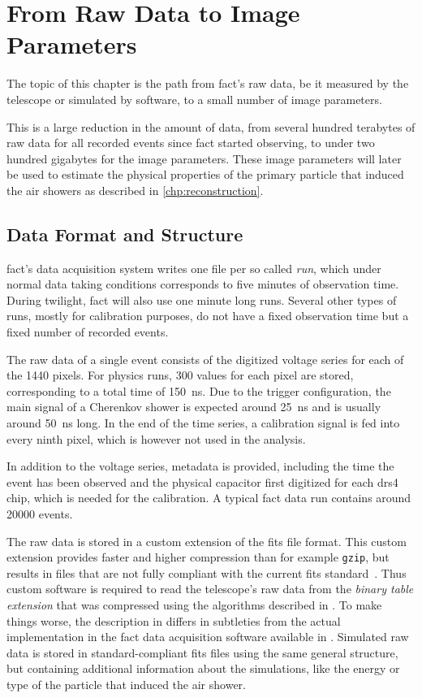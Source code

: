 \chapter{From Raw Data to Image Parameters}\label{chp:preprocessing}
The topic of this chapter is the path from \gls{fact}'s raw data, be it measured
by the telescope or simulated by software, to a small number of image parameters.

This is a large reduction in the amount of data, from several hundred terabytes
of raw data for all recorded events since \gls{fact} started observing, to
under two hundred gigabytes for the image parameters.
These image parameters will later be used to estimate the physical properties
of the primary particle that induced the air showers as described in \autoref{chp:reconstruction}.

\section{Data Format and Structure}

\gls{fact}'s data acquisition system writes one file per so called \emph{run},
which under normal data taking conditions corresponds to five minutes of observation time.
During twilight, \gls{fact} will also use one minute long runs.
Several other types of runs, mostly for calibration purposes, do not have a fixed observation time
but a fixed number of recorded events.

The raw data of a single event consists of the digitized voltage series for each
of the 1440 pixels.
For physics runs, 300 values for each pixel are stored, corresponding to a total
time of \SI{150}{\nano\second}. 
Due to the trigger configuration, the main signal of a Cherenkov shower is expected around \SI{25}{\nano\second} 
and is usually around \SI{50}{\nano\second} long. 
In the end of the time series, a calibration signal is fed into every ninth pixel,
which is however not used in the analysis.

In addition to the voltage series, metadata is provided,
including the time the event has been observed and the physical capacitor first
digitized for each \gls{drs4} chip, which is needed for the calibration.
A typical \gls{fact} data run contains around \num{20000} events.

The raw data is stored in a custom extension of the \gls{fits}\cite{fits} file format.
This custom extension provides faster and higher compression \cite{zfits} than for example \texttt{gzip}, but results in files that are not fully compliant with the current
\gls{fits} standard~\cite{fits4.0}.
Thus custom software is required to read the telescope's raw data from the \emph{binary table extension} that was compressed using the algorithms described in \cite{zfits}.
To make things worse, the description in \cite{zfits} differs in subtleties
from the actual implementation in the \gls{fact} data acquisition software available in \cite{fact++}.
Simulated raw data is stored in standard-compliant \gls{fits} files using the same
general structure, but containing additional information about the simulations,
like the energy or type of the particle that induced the air shower.

